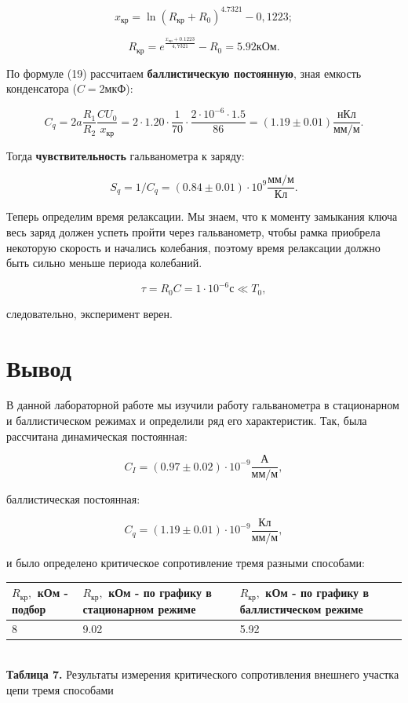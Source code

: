 \documentclass[a4paper,12pt]{article} %
\begin{document}
$$
x_\text{кр} = \ln{(R_\text{кр}+R_{0})^{4.7321}}-0,1223;
$$

$$
R_\text{кр} = e^{\frac{x_\text{кр}+0.1223}{4,7321}} - R_{0} = 5.92 \text{кОм}.
$$

\hfill \break По формуле (19) рассчитаем \textbf{баллистическую постоянную}, зная емкость конденсатора ($C = 2 \text{мкФ}$):

$$
C_{q} = 2a\frac{R_{1}}{R_{2}}\frac{CU_{0}}{x_\text{кр}} = 2 \cdot 1.20 \cdot \frac{1}{70} \cdot \frac{2 \cdot 10^{-6} \cdot 1.5}{86} = (1.19 \pm 0.01) \frac{\text{нКл}}{\text{мм}/\text{м}}.
$$

\hfill \break Тогда \textbf{чувствительность} гальванометра к заряду:

$$
S_{q} = 1/C_{q} = (0.84 \pm 0.01) \cdot 10^9 \frac{\text{мм}/\text{м}}{\text{Кл}}.
$$

\hfill \break Теперь определим время релаксации. Мы знаем, что к моменту замыкания ключа весь заряд должен успеть пройти через гальванометр, чтобы рамка приобрела некоторую скорость и начались колебания, поэтому время релаксации должно быть сильно меньше периода колебаний.

$$
\tau = R_{0}C = 1 \cdot 10^{-6} \text{с} \ll T_{0},
$$

\hfill \break следовательно, эксперимент верен.

\section{Вывод}
\hfill \break В данной лабораторной работе мы изучили работу гальванометра в стационарном и баллистическом режимах и определили ряд его характеристик. Так, была рассчитана динамическая постоянная:

$$
C_{I} = (0.97 \pm 0.02) \cdot 10^{-9} \frac{\text{А}}{\text{мм}/\text{м}},
$$

\hfill \break баллистическая постоянная:

$$
C_{q} = (1.19 \pm 0.01) \cdot 10^{-9} \frac{\text{Кл}}{\text{мм}/\text{м}},
$$

\hfill \break и было определено критическое сопротивление тремя разными способами:

\begin{center}
\begin{tabular}{|p{4cm}|p{4cm}|p{4cm}|}\hline
$ R_\text{кр}, $ кОм - подбор & $ R_\text{кр}, $ кОм - по графику в стационарном режиме & $ R_\text{кр}, $ кОм - по графику в баллистическом режиме \\\hline
8 & 9.02 & 5.92 \\\hline
\end{tabular} \\
\hfill \break \textbf {Таблица 7.} Результаты измерения критического сопротивления внешнего участка цепи тремя способами\\
\end{center}
\end{document}
